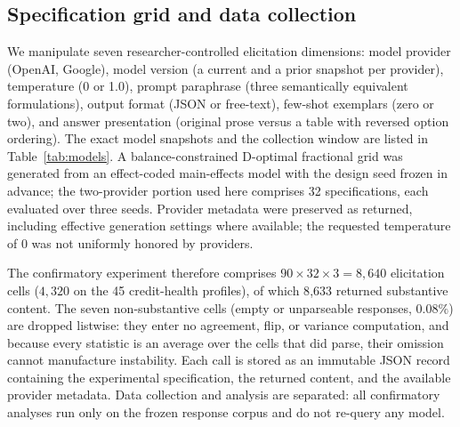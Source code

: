 \documentclass[a4paper,fleqn]{cas-sc}
\begin{document}
\subsection{Specification grid and data collection}
We manipulate seven researcher-controlled elicitation dimensions: model provider (OpenAI, Google), model
version (a current and a prior snapshot per provider), temperature (0 or 1.0), prompt paraphrase (three
semantically equivalent formulations), output format (JSON or free-text), few-shot exemplars (zero or
two), and answer presentation (original prose versus a table with reversed option ordering). The exact
model snapshots and the collection window are listed in Table~\ref{tab:models}. A balance-constrained
D-optimal fractional grid was generated from an effect-coded main-effects model with the design seed
frozen in advance; the two-provider portion used here comprises 32 specifications, each evaluated over
three seeds. Provider metadata were preserved as returned, including effective generation settings where
available; the requested temperature of 0 was not uniformly honored by providers.

The confirmatory experiment therefore comprises $90\times32\times3=8{,}640$ elicitation cells
($4{,}320$ on the 45 credit-health profiles), of which 8{,}633 returned substantive content. The seven
non-substantive cells (empty or unparseable responses, $0.08\%$) are dropped listwise: they enter no
agreement, flip, or variance computation, and because every statistic is an average over the cells that
did parse, their omission cannot manufacture instability. Each call is stored as an immutable JSON record
containing the experimental specification, the returned content, and the available provider metadata.
Data collection and analysis are separated: all confirmatory analyses run only on the frozen response
corpus and do not re-query any model.
\end{document}
